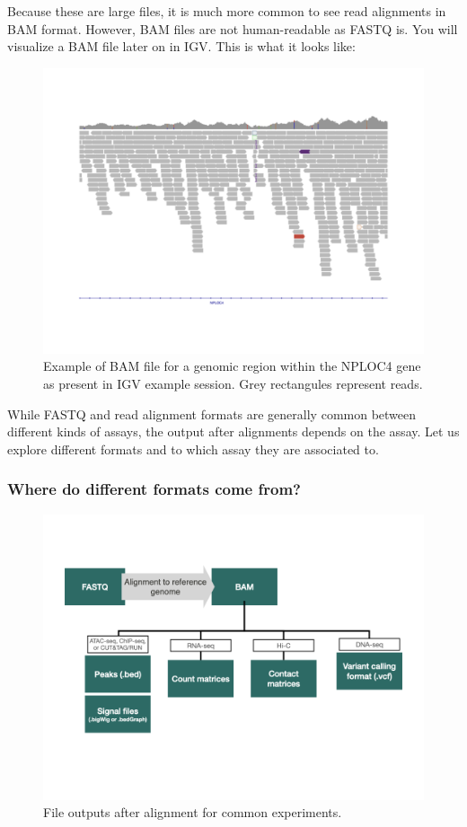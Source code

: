 \documentclass[
]{book}
\begin{document}
Because these are large files, it is much more common to see read alignments in BAM format. However, BAM files are not human-readable as FASTQ is. You will visualize a BAM file later on in IGV. This is what it looks like:

\begin{figure}
\centering
\includegraphics{figures/bamexample.png}
\caption{Example of BAM file for a genomic region within the NPLOC4 gene as present in IGV example session. Grey rectangules represent reads.}
\end{figure}

While FASTQ and read alignment formats are generally common between different kinds of assays, the output after alignments depends on the assay. Let us explore different formats and to which assay they are associated to.

\hypertarget{where-do-different-formats-come-from}{%
\subsubsection{Where do different formats come from?}\label{where-do-different-formats-come-from}}

\begin{figure}
\centering
\includegraphics{figures/fileformatorigin.png}
\caption{File outputs after alignment for common experiments.}
\end{figure}
\end{document}
